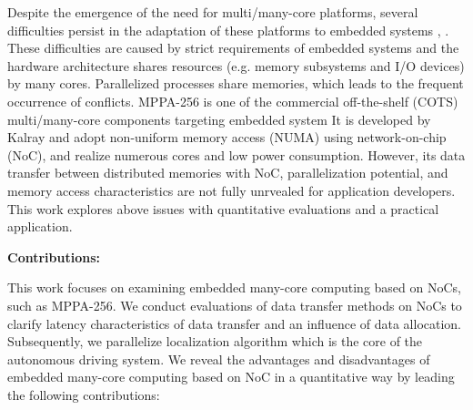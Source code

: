 \documentclass[conference,compsoc]{IEEEtran}
\newcommand{\comment}[1]{}
\begin{document}
Despite the emergence of the need for multi/many-core platforms, several difficulties persist in the adaptation of these platforms to embedded systems \cite{becker2016contention}, \cite{saidi2015shift}.
These difficulties are caused by strict requirements of embedded systems and the hardware architecture shares resources (e.g. memory subsystems and I/O devices) by many cores.
Parallelized processes share memories, which leads to the frequent occurrence of conflicts.
MPPA-256 \cite{de2014time} is one of the commercial off-the-shelf (COTS) multi/many-core components targeting embedded system
It is developed by Kalray and adopt non-uniform memory access (NUMA) using network-on-chip (NoC), and realize numerous cores and low power consumption.
However, its data transfer between distributed memories with NoC, parallelization potential, and memory access characteristics are not fully unrvealed for application developers.
This work explores above issues with quantitative evaluations and a practical application.


\textbf{Contributions:}
\comment{1-1, 3-3: To be clarified}
This work focuses on examining embedded many-core computing based on NoCs, such as MPPA-256.
We conduct evaluations of data transfer methods on NoCs to clarify latency characteristics of data transfer and an influence of data allocation.
Subsequently, we parallelize localization algorithm which is the core of the autonomous driving system.
We reveal the advantages and disadvantages of embedded many-core computing based on NoC in a quantitative way by leading the following contributions:
\end{document}
